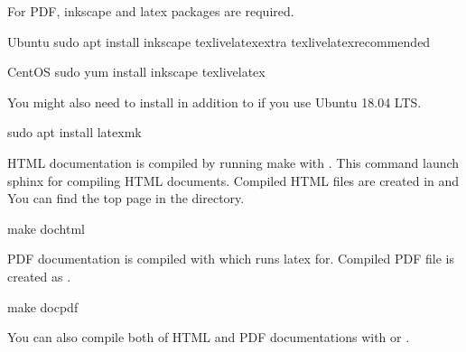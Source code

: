 \documentclass[a4paper,11pt,openany,oneside,english]{sphinxmanual}
\begin{document}
For PDF, inkscape and latex packages are required.

\begin{sphinxVerbatim}[commandchars=\\\{\},formatcom=\footnotesize]
 Ubuntu
 sudo apt install inkscape 
  texlive\PYGZhy{}latex\PYGZhy{}extra 
  texlive\PYGZhy{}latex\PYGZhy{}recommended
\end{sphinxVerbatim}

\begin{sphinxVerbatim}[commandchars=\\\{\},formatcom=\footnotesize]
 CentOS
 sudo yum install inkscape 
  texlive\PYGZhy{}latex
\end{sphinxVerbatim}

You might also need to install  in addition to if you use
Ubuntu 18.04 LTS.

\begin{sphinxVerbatim}[commandchars=\\\{\},formatcom=\footnotesize]
 sudo apt install latexmk
\end{sphinxVerbatim}

HTML documentation is compiled by running make with . This
command launch sphinx for compiling HTML documents.
Compiled HTML files are created in  and
You can find the top page  in the directory.

\begin{sphinxVerbatim}[commandchars=\\\{\},formatcom=\footnotesize]
 make doc\PYGZhy{}html
\end{sphinxVerbatim}

PDF documentation is compiled with  which runs latex for.
Compiled PDF file is created as .

\begin{sphinxVerbatim}[commandchars=\\\{\},formatcom=\footnotesize]
 make doc\PYGZhy{}pdf
\end{sphinxVerbatim}

You can also compile both of HTML and PDF documentations with  or
.
\end{document}
